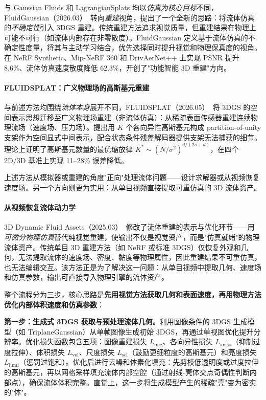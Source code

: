 与 Gaussian Fluids 和 LagrangianSplats 均以\emph{仿真为核心目标}不同，FluidGaussian（2026.03）~\cite{2603_21356}转向\emph{重建}视角，提出了一个全新的思路：将流体仿真的\emph{不确定性}引入 3DGS 重建。传统重建方法追求视觉质量，但重建结果在物理上可能不可行（如流体内部存在非零散度）。FluidGaussian 定义基于流体仿真的不确定性度量，将其与主动学习结合，优先选择同时提升视觉和物理保真度的视角。在 NeRF Synthetic、Mip-NeRF 360 和 DrivAerNet++ 上实现 PSNR 提升 8.6\%、流体仿真速度散度降低 62.3\%，开创了"功能智能 3D 重建"方向。

\paragraph{FLUIDSPLAT：广义物理场的高斯基元重建}

与前述方法均围绕\emph{流体本身}展开不同，FLUIDSPLAT（2026.05）~\cite{2605_18866}将 3DGS 的空间表示思想迁移至广义物理场重建（非流体仿真）：从稀疏表面传感器重建连续物理流场（速度场、压力场）。提出用 $K$ 个各向异性高斯基元构成 partition-of-unity 支架作为空间显式中间表示，配合状态条件残差解码器提供支架无法捕获的细节。理论上证明了高斯基元数量的最优缩放律 $K^* \sim (N/\sigma^2)^{d/(2s+d)}$，在四个 2D/3D 基准上实现 11--28\% 误差降低。

上述方法从模拟器或重建的角度"正向"处理流体问题——设计求解器或从视频恢复速度场。另一个方向则更为实用：从单目视频直接提取可重仿真的 3D 流体资产。

\paragraph{从视频恢复流体动力学}

3D Dynamic Fluid Assets（2025.03）~\cite{2503_00868}修改了流体重建的表示与优化环节——用\emph{可微分物理仿真}替代纯视觉重建，使输出不仅是视觉资产，而是"仿真就绪"的物理流体资产。传统单目 3D 重建方法（如 NeRF 或标准 3DGS）仅恢复外观和几何，无法提取流体的速度场、密度、黏度等物理属性，因此重建结果不可重仿真，也无法编辑交互。该方法正是为了解决这一问题：从单目视频中提取几何、速度场和仿真参数，输出可直接导入物理引擎的流体资产。

整个流程分为三步，核心思路是\textbf{先用视觉方法获取几何和表面速度，再用物理方法优化内部体积速度和仿真参数}：

\textbf{第一步：生成式 3DGS 获取与预处理流体几何。}利用图像条件的 3DGS 生成模型（如 TriplaneGaussian）从单帧图像生成初始 3DGS，再通过单视图优化提升分辨率。优化损失函数包含五项：图像重建损失 $L_\text{img}$、各向异性损失 $L_\text{aniso}$（抑制过度拉伸）、体积损失 $L_\text{vol}$、尺度损失 $L_\text{scl}$（鼓励更细粒度的高斯基元）和亮度损失 $L_\text{lumi}$（惩罚过饱和）。优化后进行去噪和体素化填充：先剪枝低透明度或过度拉伸的高斯基元，再以网格采样填充流体内部空腔（通过射线-壳体交点奇偶性判断内部点），确保流体体积完整。直觉上，这一步将生成模型产生的稀疏"壳"变为密实的"体"。

